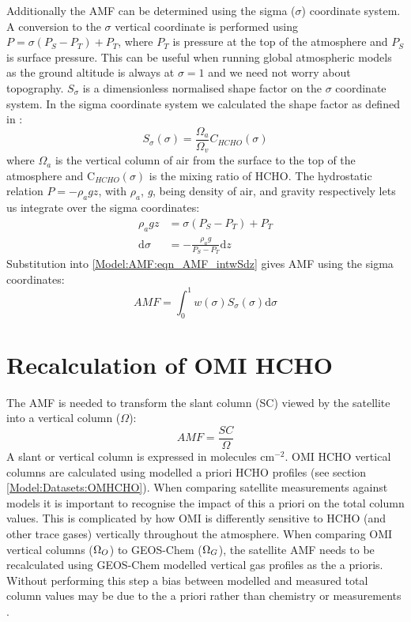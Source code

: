   Additionally the AMF can be determined using the sigma ($\sigma$) coordinate system.
  A conversion to the $\sigma$ vertical coordinate is performed using $P = \sigma (P_S - P_T) + P_T$, where $P_T$ is pressure at the top of the atmosphere and $P_S$ is surface pressure.
  This can be useful when running global atmospheric models as the ground altitude is always at $\sigma=1$ and we need not worry about topography. 
  $S_\sigma$ is a dimensionless normalised shape factor on the $\sigma$ coordinate system.
  In the sigma coordinate system we calculated the shape factor as defined in \textcite{Palmer2001}:
  \begin{equation}
    \label{Model:AMF:eqn_ShapeFactorSigma}
    S_\sigma(\sigma) = \frac{\Omega_a}{\Omega_v}C_{HCHO}(\sigma)
  \end{equation}
  where $\Omega_a$ is the vertical column of air from the surface to the top of the atmosphere and C$_{HCHO}(\sigma)$ is the mixing ratio of HCHO.
  The hydrostatic relation $P = - \rho_a g z$, with $\rho_a$, \textit{g}, being density of air, and gravity respectively lets us integrate over the sigma coordinates:
  \begin{align*}
    \rho_a g z & = \sigma \left( P_S - P_T \right) + P_T \\
    \mathrm{d}\sigma  & = - \frac{ \rho_a g }{ P_S - P_T } \mathrm{d}z
  \end{align*}
  Substitution into \ref{Model:AMF:eqn_AMF_intwSdz} gives AMF using the sigma coordinates:
  \begin{equation} \label{Model:AMF:eqn_AMFintwSdsigma}
    AMF = \int_0^1 w(\sigma) S_\sigma(\sigma) \mathrm{d}\sigma
  \end{equation}

\section{Recalculation of OMI HCHO}
  \label{Model:omiRecalc}
  
  The AMF is needed to transform the slant column (SC) viewed by the satellite into a vertical column ($\Omega$):
  \begin{equation}
    \label{Model:omiRecalc:eqn_AMFratio}
    AMF = \frac{SC}{\Omega} %
  \end{equation}
  A slant or vertical column is expressed in molecules cm$^{-2}$.
  OMI HCHO vertical columns are calculated using modelled a priori HCHO profiles (see section \ref{Model:Datasets:OMHCHO}).
  When comparing satellite measurements against models it is important to recognise the impact of this a priori on the total column values.
  This is complicated by how OMI is differently sensitive to HCHO (and other trace gases) vertically throughout the atmosphere.
  When comparing OMI vertical columns ($\Omega_{O}$) to GEOS-Chem ($\Omega_{G}$), the satellite AMF needs to be recalculated using GEOS-Chem modelled vertical gas profiles as the a prioris.
  Without performing this step a bias between modelled and measured total column values may be due to the a priori rather than chemistry or measurements \parencite{Palmer2001, Lamsal2014}.
  
